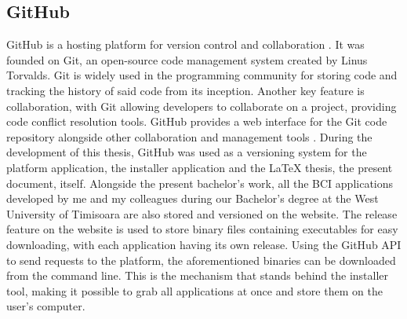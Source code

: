\subsection{GitHub}
GitHub is a hosting platform for version control and collaboration \cite{github_HelloWorlds}. It was founded on Git, an open-source code management system created by Linus Torvalds. Git is widely used in the programming community for storing code and tracking the history of said code from its inception. Another key feature is collaboration, with Git allowing developers to collaborate on a project, providing code conflict resolution tools. GitHub provides a web interface for the Git code repository alongside other collaboration and management tools \cite{whatsGithub}. During the development of this thesis, GitHub was used as a versioning system for the platform application, the installer application and the LaTeX thesis, the present document, itself.
\vspace{\baselineskip}\newline
Alongside the present bachelor's work, all the BCI applications developed by me and my colleagues during our Bachelor's degree at the West University of Timisoara are also stored and versioned on the website. The release feature on the website is used to store binary files containing executables for easy downloading, with each application having its own release. Using the GitHub API to send requests to the platform, the aforementioned binaries can be downloaded from the command line. This is the mechanism that stands behind the installer tool, making it possible to grab all applications at once and store them on the user's computer.

